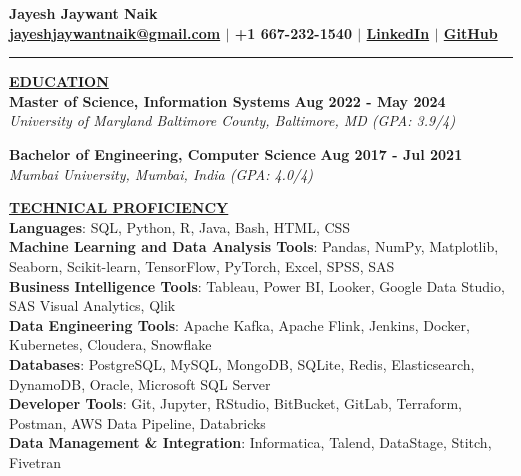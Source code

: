 \documentclass{article}
\begin{document}
\begin{center}
\thispagestyle{empty}
\large \textbf{Jayesh Jaywant Naik \\}
\normalsize \textbf{\href{mailto:jayeshjaywantnaik@gmail.com}{jayeshjaywantnaik@gmail.com} $\mid$ +1 667-232-1540 $\mid$ \href{https://www.linkedin.com/in/jayeshjnaik}{LinkedIn} $\mid$ \href{https://github.com/jayeshjnaik}{GitHub} \\}
\rule{\textwidth}{1pt}
\end{center}

\noindent \textbf{\underline{EDUCATION}} \\
\textbf{Master of Science, Information Systems } \hfill \textbf{Aug 2022 - May 2024} \\
\textit{University of Maryland Baltimore County, Baltimore, MD (GPA: 3.9/4)}  
\begin{itemize}[noitemsep,nolistsep,leftmargin=*]
\end{itemize}
\begin{itemize}
\end{itemize}
\textbf{Bachelor of Engineering, Computer Science} \hfill \textbf{Aug 2017 - Jul 2021} \\
\textit{Mumbai University, Mumbai, India (GPA: 4.0/4)}\\
\begin{itemize}[noitemsep,nolistsep,leftmargin=*]
\end{itemize}


\noindent \textbf{\underline{TECHNICAL PROFICIENCY}} \\
\textbf{Languages}{: \small SQL, Python, R, Java, Bash, HTML, CSS} \\
\textbf{Machine Learning and Data Analysis Tools}{: \small Pandas, NumPy, Matplotlib, Seaborn, Scikit-learn, TensorFlow, PyTorch, Excel, SPSS, SAS} \\
\textbf{Business Intelligence Tools}{: \small Tableau, Power BI, Looker, Google Data Studio, SAS Visual Analytics, Qlik} \\
\textbf{Data Engineering Tools}{: \small Apache Kafka, Apache Flink, Jenkins, Docker, Kubernetes, Cloudera, Snowflake} \\
\textbf{Databases}{: \small PostgreSQL, MySQL, MongoDB, SQLite, Redis, Elasticsearch, DynamoDB, Oracle, Microsoft SQL Server} \\
\textbf{Developer Tools}{: \small Git, Jupyter, RStudio, BitBucket, GitLab, Terraform, Postman, AWS Data Pipeline, Databricks} \\
\textbf{Data Management \& Integration}{: \small Informatica, Talend, DataStage, Stitch, Fivetran}
\vspace{2mm}
\end{document}
